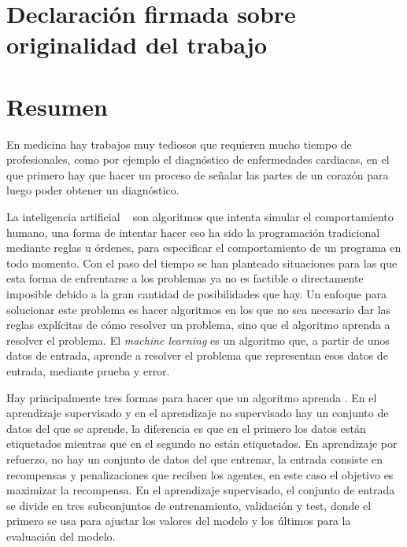 \documentclass[12pt,a4paper]{article}
\begin{document}
\newpage
\listoftables

\newpage
{}
\section*{Declaración firmada sobre originalidad del trabajo}

\newpage
\section*{Resumen}
En medicina hay trabajos muy tediosos que requieren mucho tiempo de profesionales, como por ejemplo el diagnóstico de enfermedades cardiacas, en el que primero hay que hacer un proceso de señalar las partes de un corazón para luego poder obtener un diagnóstico.
\bigskip

La inteligencia artificial ~\cite{wiki:ai} son algoritmos que intenta simular el comportamiento humano, una forma de intentar hacer eso ha sido la programación tradicional mediante reglas u órdenes, para especificar el comportamiento de un programa en todo momento. Con el paso del tiempo se han planteado situaciones para las que esta forma de enfrentarse a los problemas ya no es factible o directamente imposible debido a la gran cantidad de posibilidades que hay. Un enfoque para solucionar este problema es hacer algoritmos en los que no sea necesario dar las reglas explícitas de cómo resolver un problema, sino que el algoritmo aprenda a resolver el problema. El \textit{machine learning} es un algoritmo que, a partir de unos datos de entrada, aprende a resolver el problema que representan esos datos de entrada, mediante prueba y error.
\bigskip

Hay principalmente tres formas para hacer que un algoritmo aprenda \cite{wiki:ml}. En el aprendizaje supervisado y en el aprendizaje no supervisado hay un conjunto de datos del que se aprende, la diferencia es que en el primero los datos están etiquetados mientras que en el segundo no están etiquetados. En aprendizaje por refuerzo, no hay un conjunto de datos del que entrenar, la entrada consiste en recompensas y penalizaciones que reciben los agentes, en este caso el objetivo es maximizar la recompensa. En el aprendizaje supervisado, el conjunto de entrada se divide en tres subconjuntos de entrenamiento, validación y test, donde el primero se usa para ajustar los valores del modelo y los últimos para la evaluación del modelo.
\bigskip
\end{document}
